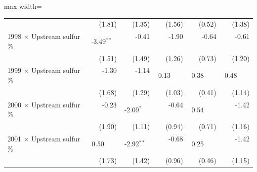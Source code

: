 \begin{table}[htbp]
{\begin{adjustbox}{max width=\linewidth}
\begin{tabular}{lrrrrr}
 & (\phantom{-}1.81)\phantom{$^{***}$} & (\phantom{-}1.35)\phantom{$^{***}$} & (\phantom{-}1.56)\phantom{$^{***}$} & (\phantom{-}0.52)\phantom{$^{***}$} & (\phantom{-}1.38)\phantom{$^{***}$} \\
1998 $\times$ Upstream sulfur \% & \phantom{(}-3.49$^{**\phantom{*}}$ & \phantom{(}-0.41$^{\phantom{*}\phantom{*}\phantom{*}}$ & \phantom{(}-1.90$^{\phantom{*}\phantom{*}\phantom{*}}$ & \phantom{(}-0.64$^{\phantom{*}\phantom{*}\phantom{*}}$ & \phantom{(}-0.61$^{\phantom{*}\phantom{*}\phantom{*}}$ \\
 & (\phantom{-}1.51)\phantom{$^{***}$} & (\phantom{-}1.49)\phantom{$^{***}$} & (\phantom{-}1.26)\phantom{$^{***}$} & (\phantom{-}0.73)\phantom{$^{***}$} & (\phantom{-}1.20)\phantom{$^{***}$} \\
1999 $\times$ Upstream sulfur \% & \phantom{(}-1.30$^{\phantom{*}\phantom{*}\phantom{*}}$ & \phantom{(}-1.14$^{\phantom{*}\phantom{*}\phantom{*}}$ & \phantom{(}\phantom{-}0.13$^{\phantom{*}\phantom{*}\phantom{*}}$ & \phantom{(}\phantom{-}0.38$^{\phantom{*}\phantom{*}\phantom{*}}$ & \phantom{(}\phantom{-}0.48$^{\phantom{*}\phantom{*}\phantom{*}}$ \\
 & (\phantom{-}1.68)\phantom{$^{***}$} & (\phantom{-}1.29)\phantom{$^{***}$} & (\phantom{-}1.03)\phantom{$^{***}$} & (\phantom{-}0.41)\phantom{$^{***}$} & (\phantom{-}1.14)\phantom{$^{***}$} \\
2000 $\times$ Upstream sulfur \% & \phantom{(}-0.23$^{\phantom{*}\phantom{*}\phantom{*}}$ & \phantom{(}-2.09$^{*\phantom{*}\phantom{*}}$ & \phantom{(}-0.64$^{\phantom{*}\phantom{*}\phantom{*}}$ & \phantom{(}\phantom{-}0.54$^{\phantom{*}\phantom{*}\phantom{*}}$ & \phantom{(}-1.42$^{\phantom{*}\phantom{*}\phantom{*}}$ \\
 & (\phantom{-}1.90)\phantom{$^{***}$} & (\phantom{-}1.11)\phantom{$^{***}$} & (\phantom{-}0.94)\phantom{$^{***}$} & (\phantom{-}0.71)\phantom{$^{***}$} & (\phantom{-}1.16)\phantom{$^{***}$} \\
2001 $\times$ Upstream sulfur \% & \phantom{(}\phantom{-}0.50$^{\phantom{*}\phantom{*}\phantom{*}}$ & \phantom{(}-2.92$^{**\phantom{*}}$ & \phantom{(}-0.68$^{\phantom{*}\phantom{*}\phantom{*}}$ & \phantom{(}\phantom{-}0.25$^{\phantom{*}\phantom{*}\phantom{*}}$ & \phantom{(}-1.42$^{\phantom{*}\phantom{*}\phantom{*}}$ \\
 & (\phantom{-}1.73)\phantom{$^{***}$} & (\phantom{-}1.42)\phantom{$^{***}$} & (\phantom{-}0.96)\phantom{$^{***}$} & (\phantom{-}0.46)\phantom{$^{***}$} & (\phantom{-}1.15)\phantom{$^{***}$} \\

\end{tabular}
\end{adjustbox}}
\end{table}
